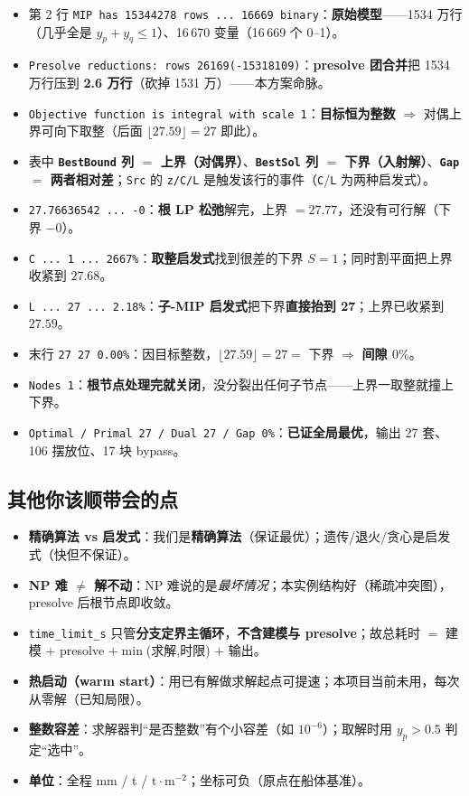 \documentclass[11pt]{ctexart}
\newcommand{\code}[1]{\texttt{#1}}
\begin{document}
\begin{itemize}[leftmargin=1.8em,itemsep=2pt]
  \item 第 2 行 \texttt{MIP has 15344278 rows ... 16669 binary}：\textbf{原始模型}——1534 万行（几乎全是 $y_p{+}y_q\le1$）、16\,670 变量（16\,669 个 0--1）。
  \item \texttt{Presolve reductions: rows 26169(-15318109)}：\textbf{presolve 团合并}把 1534 万行压到 \textbf{2.6 万行}（砍掉 1531 万）——本方案命脉。
  \item \texttt{Objective function is integral with scale 1}：\textbf{目标恒为整数} $\Rightarrow$ 对偶上界可向下取整（后面 $\lfloor27.59\rfloor{=}27$ 即此）。
  \item 表中 \textbf{\texttt{BestBound} 列 $=$ 上界（对偶界）}、\textbf{\texttt{BestSol} 列 $=$ 下界（入射解）}、\textbf{\texttt{Gap} $=$ 两者相对差}；\texttt{Src} 的 \texttt{z/C/L} 是触发该行的事件（\texttt{C}/\texttt{L} 为两种启发式）。
  \item \texttt{27.76636542 ... -0}：\textbf{根 LP 松弛}解完，上界 $=27.77$，还没有可行解（下界 $-0$）。
  \item \texttt{C ... 1 ... 2667\%}：\textbf{取整启发式}找到很差的下界 $S=1$；同时割平面把上界收紧到 $27.68$。
  \item \texttt{L ... 27 ... 2.18\%}：\textbf{子-MIP 启发式}把下界\textbf{直接抬到 27}；上界已收紧到 $27.59$。
  \item 末行 \texttt{27 27 0.00\%}：因目标整数，$\lfloor27.59\rfloor{=}27{=}$ 下界 $\Rightarrow$ \textbf{间隙 $0\%$}。
  \item \texttt{Nodes 1}：\textbf{根节点处理完就关闭}，没分裂出任何子节点——上界一取整就撞上下界。
  \item \texttt{Optimal / Primal 27 / Dual 27 / Gap 0\%}：\textbf{已证全局最优}，输出 27 套、106 摆放位、17 块 bypass。
\end{itemize}

\subsection{其他你该顺带会的点}
\begin{itemize}[leftmargin=1.8em,itemsep=2pt]
  \item \textbf{精确算法 vs 启发式}：我们是\textbf{精确算法}（保证最优）；遗传/退火/贪心是启发式（快但不保证）。
  \item \textbf{NP 难 $\neq$ 解不动}：NP 难说的是\emph{最坏情况}；本实例结构好（稀疏冲突图），presolve 后根节点即收敛。
  \item \code{time\_limit\_s} 只管\textbf{分支定界主循环}，\textbf{不含建模与 presolve}；故总耗时 $=$ 建模 $+$ presolve $+\min$(求解,时限) $+$ 输出。
  \item \textbf{热启动（warm start）}：用已有解做求解起点可提速；本项目当前未用，每次从零解（已知局限）。
  \item \textbf{整数容差}：求解器判“是否整数”有个小容差（如 $10^{-6}$）；取解时用 $y_p>0.5$ 判定“选中”。
  \item \textbf{单位}：全程 mm / t / $\mathrm{t\cdot m^{-2}}$；坐标可负（原点在船体基准）。
\end{itemize}
\end{document}
